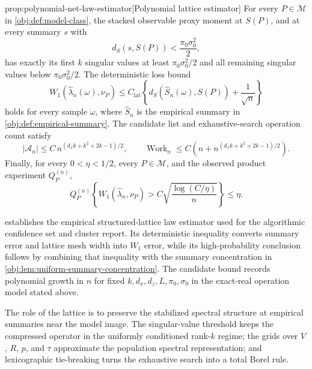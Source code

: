 \documentclass[11pt]{article}
\begin{document}
\begin{propositionv}{prop:polynomial-net-law-estimator}[Polynomial lattice estimator]
For every \(P\in\mathcal M\) in \cref{obj:def:model-class}, the stacked observable proxy moment at \(S(P)\), and at every summary \(s\) with
\[
d_S(s,S(P))<\frac{\pi_0\sigma_0^2}{2},
\]
has exactly its first \(k\) singular values at least \(\pi_0\sigma_0^2/2\) and all remaining singular values below \(\pi_0\sigma_0^2/2\).  The deterministic loss bound
\[
W_1(\widehat\lambda_n(\omega),\nu_P)
\le
C_{\mathrm{lat}}\left\{
d_S(\widehat S_n(\omega),S(P))+\frac{1}{\sqrt n}
\right\}
\]
holds for every sample \(\omega\), where \(\widehat S_n\) is the empirical summary in \cref{obj:def:empirical-summary}.  The candidate list and exhaustive-search operation count satisfy
\[
|\mathcal A_n|
\le C\, n^{(d_xk+k^2+2k-1)/2},
\qquad
\operatorname{Work}_n
\le
C\left(n+n^{(d_xk+k^2+2k-1)/2}\right).
\]
Finally, for every \(0<\eta<1/2\), every \(P\in\mathcal M\), and the observed product experiment \(Q_P^{(n)}\),
\[
Q_P^{(n)}\!\left\{
W_1(\widehat\lambda_n,\nu_P)>
C\sqrt{\frac{\log(C/\eta)}{n}}
\right\}
\le \eta .
\]
\end{propositionv}

 establishes the empirical structured-lattice law estimator used for the algorithmic confidence set and cluster report. Its deterministic inequality converts summary error and lattice mesh width into \(W_1\) error, while its high-probability conclusion follows by combining that inequality with the summary concentration in \cref{obj:lem:uniform-summary-concentration}. The candidate bound records polynomial growth in \(n\) for fixed \(k,d_x,d_z,L,\pi_0,\sigma_0\) in the exact-real operation model stated above.

The role of the lattice is to preserve the stabilized spectral structure at empirical summaries near the model image. The singular-value threshold keeps the compressed operator in the uniformly conditioned rank-\(k\) regime; the grids over \(V\), \(R\), \(p\), and \(\tau\) approximate the population spectral representation; and lexicographic tie-breaking turns the exhaustive search into a total Borel rule.
\end{document}
